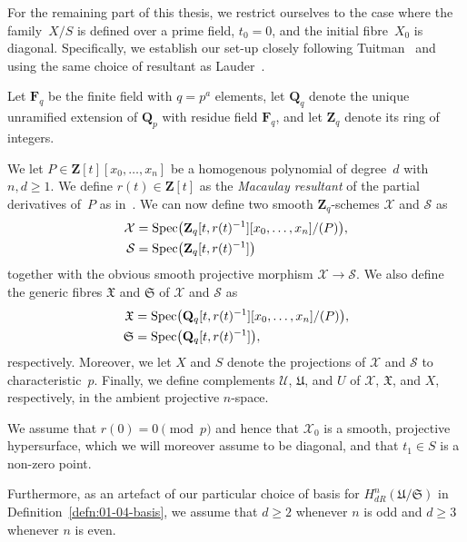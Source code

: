 For the remaining part of this thesis, we restrict ourselves to the case 
where the family~$X/S$ is defined over a prime field, $t_0 = 0$, and the 
initial fibre~$X_0$ is diagonal.  Specifically, we establish our set-up 
closely following Tuitman~\citep[\S 3.6]{Tuitman2011} and using the same 
choice of resultant as Lauder~\citep[\S 2.3.2]{Lauder2011}.

\begin{notation} \label{not:01-02-main}
Let $\mathbf{F}_q$ be the finite field with $q = p^a$ elements, 
let $\mathbf{Q}_q$ denote the unique unramified extension of $\mathbf{Q}_p$ 
with residue field $\mathbf{F}_q$, and let $\mathbf{Z}_q$ denote its 
ring of integers.

We let $P \in \mathbf{Z}[t][x_0,\dotsc,x_n]$ be a homogenous polynomial 
of degree~$d$ with $n, d \geq 1$.  We define $r(t) \in \mathbf{Z}[t]$ as 
the \emph{Macaulay resultant} of the partial derivatives of~$P$ as 
in~\citep[Page~7, Chapter~I.6]{Macaulay1994}.  We can now define two 
smooth $\mathbf{Z}_q$-schemes $\mathcal{X}$ and $\mathcal{S}$ as 
\begin{align*}
\mathcal{X} & = \operatorname{Spec}\bigl( \mathbf{Z}_q[t,r(t)^{-1}][x_0,\dotsc,x_n] / (P)\bigr), \\
\mathcal{S} & = \operatorname{Spec}\bigl( \mathbf{Z}_q[t,r(t)^{-1}] \bigr)
\end{align*}
together with the obvious smooth projective morphism 
$\mathcal{X} \to \mathcal{S}$.  We also define the generic fibres 
$\mathfrak{X}$ and $\mathfrak{S}$ of $\mathcal{X}$ and $\mathcal{S}$ as 
\begin{align*}
\mathfrak{X} & = \operatorname{Spec}\bigl( \mathbf{Q}_q[t,r(t)^{-1}][x_0,\dotsc,x_n] / (P)\bigr), \\
\mathfrak{S} & = \operatorname{Spec}\bigl( \mathbf{Q}_q[t,r(t)^{-1}] \bigr),
\end{align*}
respectively.  Moreover, we let $X$ and $S$ denote the projections 
of $\mathcal{X}$ and $\mathcal{S}$ to characteristic~$p$. 
Finally, we define complements $\mathcal{U}$, $\mathfrak{U}$, and $U$ 
of $\mathcal{X}$, $\mathfrak{X}$, and $X$, respectively, in the 
ambient projective $n$-space.

We assume that $r(0) = 0 \pmod{p}$ and hence that $\mathcal{X}_0$ is 
a smooth, projective hypersurface, which we will moreover assume to be 
diagonal, and that $t_1 \in S$ is a non-zero point.
\end{notation}

\begin{notation}
Furthermore, as an artefact of our particular choice of basis for 
$H_{dR}^n(\mathfrak{U}/\mathfrak{S})$ in Definition~\ref{defn:01-04-basis}, 
we assume that $d \geq 2$ whenever $n$ is odd and $d \geq 3$ whenever $n$ 
is even.
\end{notation}

